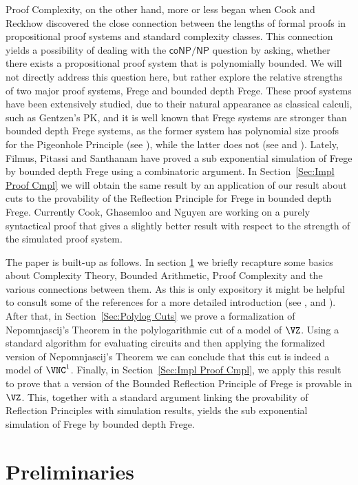 \documentclass{LMCS}
\begin{document}
Proof Complexity, on the other hand, more or less began when Cook and Reckhow \cite{CR79} discovered the close
connection between the lengths of formal proofs in propositional proof systems and standard complexity classes.
This connection yields a possibility of dealing with the $\mathsf{coNP/NP}$ question by asking, whether there
exists a propositional proof system that is polynomially bounded. We will not directly address this question
here, but rather explore the relative strengths of two major proof systems, Frege and bounded depth Frege. These
proof systems have been extensively studied, due to their natural appearance as classical calculi, such as
Gentzen's PK, and it is well known that Frege systems are stronger than bounded depth Frege systems, as the
former system has polynomial size proofs for the Pigeonhole Principle (see \cite{Bu87}), while the latter does
not (see \cite{KPW95} and \cite{PBI93}). Lately, Filmus, Pitassi and Santhanam \cite{FPS11} have proved a sub
exponential simulation of Frege by bounded depth Frege using a combinatoric argument. In Section~\ref{Sec:Impl
Proof Cmpl} we will obtain the same result by an application of our result about cuts to the provability of the
Reflection Principle for Frege in bounded depth Frege. Currently Cook, Ghasemloo and Nguyen \cite{CGN12} are
working on a purely syntactical proof that gives a slightly better result with respect to the strength of the
simulated proof system.

The paper is built-up as follows. In section \ref{Sec:Preliminaries} we briefly recapture some basics about
Complexity Theory, Bounded Arithmetic, Proof Complexity and the various connections between them. As this is
only expository it might be helpful to consult some of the references for a more detailed introduction (see
\cite{AB09}, \cite{CN10} and \cite{Kra95}). After that, in Section~\ref{Sec:Polylog Cuts} we prove a
formalization of Nepomnjascij's Theorem in the polylogarithmic cut of a model of $\VZ$. Using a standard
algorithm for evaluating circuits and then applying the formalized version of Nepomnjascij's Theorem we can
conclude that this cut is indeed a model of $\VNC^1$. Finally, in Section~\ref{Sec:Impl Proof Cmpl}, we apply
this result to prove that a version of the Bounded Reflection Principle of Frege is provable in $\VZ$. This,
together with a standard argument linking the provability of Reflection Principles with simulation results,
yields the sub exponential simulation of Frege by bounded depth Frege.


\section{Preliminaries}\label{Sec:Preliminaries}
\end{document}
